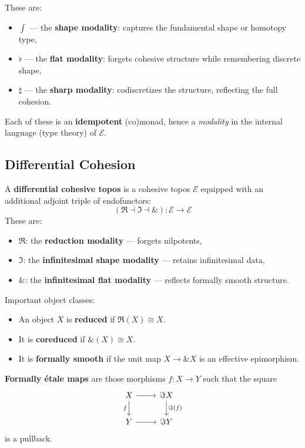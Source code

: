 \documentclass{article}
\begin{document}
These are:
\begin{itemize}
  \item $\int$ — the \textbf{shape modality}: captures the fundamental shape or homotopy type,
  \item $\flat$ — the \textbf{flat modality}: forgets cohesive structure while remembering discrete shape,
  \item $\sharp$ — the \textbf{sharp modality}: codiscretizes the structure, reflecting the full cohesion.
\end{itemize}

Each of these is an \textbf{idempotent} (co)monad, hence a \emph{modality} in the internal language (type theory) of $\mathcal{E}$.


\newpage
\subsection{Differential Cohesion}

A \textbf{differential cohesive topos} is a cohesive topos $\mathcal{E}$ equipped with an additional adjoint triple of endofunctors:
\[
(\Re \dashv \Im \dashv \&) : \mathcal{E} \to \mathcal{E}
\]
These are:
\begin{itemize}
  \item $\Re$: the \textbf{reduction modality} — forgets nilpotents,
  \item $\Im$: the \textbf{infinitesimal shape modality} — retains infinitesimal data,
  \item $\&$: the \textbf{infinitesimal flat modality} — reflects formally smooth structure.
\end{itemize}

Important object classes:
\begin{itemize}
  \item An object $X$ is \textbf{reduced} if $\Re(X) \cong X$.
  \item It is \textbf{coreduced} if $\&(X) \cong X$.
  \item It is \textbf{formally smooth} if the unit map $X \to \& X$ is an effective epimorphism.
\end{itemize}

\textbf{Formally étale maps} are those morphisms \( f: X \to Y \) such that the square
\[
\begin{tikzcd}
X \arrow[r] \arrow[d, "f"'] & \Im X \arrow[d, "\Im(f)"] \\
Y \arrow[r] & \Im Y
\end{tikzcd}
\]
is a pullback.
\end{document}
